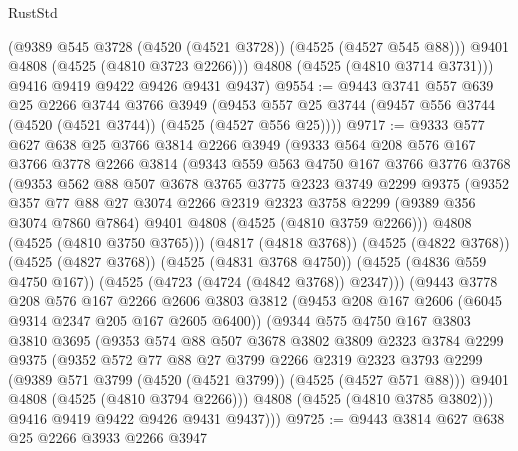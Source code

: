 \begin{lexlean}{RustStd}
\begin{coremodule}
          (@9389 @545 @3728 (@4520 (@4521 @3728)) (@4525 (@4527 @545 @88)))
          @9401
          @4808
          (@4525 (@4810 @3723 @2266)))
        @4808
        (@4525 (@4810 @3714 @3731)))
      @9416
      @9419
      @9422
      @9426
      @9431
      @9437)
@9554 := @9443
    @3741
    @557
    @639
    @25
    @2266
    @3744
    @3766
    @3949
    (@9453 @557 @25 @3744 (@9457 @556 @3744 (@4520 (@4521 @3744)) (@4525 (@4527 @556 @25))))
@9717 := @9333
    @577
    @627
    @638
    @25
    @3766
    @3814
    @2266
    @3949
    (@9333
      @564
      @208
      @576
      @167
      @3766
      @3778
      @2266
      @3814
      (@9343
        @559
        @563
        @4750
        @167
        @3766
        @3776
        @3768
        (@9353
          @562
          @88
          @507
          @3678
          @3765
          @3775
          @2323
          @3749
          @2299
          @9375
          (@9352
            @357
            @77
            @88
            @27
            @3074
            @2266
            @2319
            @2323
            @3758
            @2299
            (@9389 @356 @3074 @7860 @7864)
            @9401
            @4808
            (@4525 (@4810 @3759 @2266)))
          @4808
          (@4525 (@4810 @3750 @3765)))
        (@4817 (@4818 @3768))
        (@4525 (@4822 @3768))
        (@4525 (@4827 @3768))
        (@4525 (@4831 @3768 @4750))
        (@4525 (@4836 @559 @4750 @167))
        (@4525 (@4723 (@4724 (@4842 @3768)) @2347)))
      (@9443
        @3778
        @208
        @576
        @167
        @2266
        @2606
        @3803
        @3812
        (@9453 @208 @167 @2606 (@6045 @9314 @2347 @205 @167 @2605 @6400))
        (@9344
          @575
          @4750
          @167
          @3803
          @3810
          @3695
          (@9353
            @574
            @88
            @507
            @3678
            @3802
            @3809
            @2323
            @3784
            @2299
            @9375
            (@9352
              @572
              @77
              @88
              @27
              @3799
              @2266
              @2319
              @2323
              @3793
              @2299
              (@9389 @571 @3799 (@4520 (@4521 @3799)) (@4525 (@4527 @571 @88)))
              @9401
              @4808
              (@4525 (@4810 @3794 @2266)))
            @4808
            (@4525 (@4810 @3785 @3802)))
          @9416
          @9419
          @9422
          @9426
          @9431
          @9437)))
@9725 := @9443 @3814 @627 @638 @25 @2266 @3933 @2266 @3947

\end{coremodule}
\end{lexlean}
